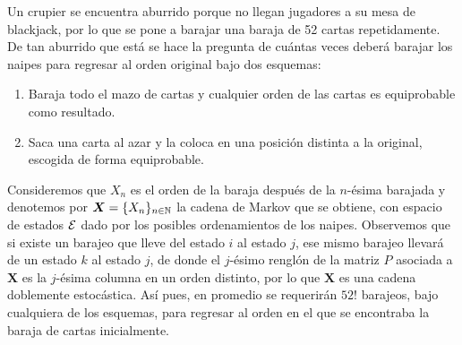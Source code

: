 \begin{example}
    Un crupier se encuentra aburrido porque no llegan jugadores a su mesa de blackjack, por lo que se pone a barajar una baraja de 52 cartas repetidamente. De tan aburrido que está se hace la pregunta de cuántas veces deberá barajar los naipes para regresar al orden original bajo dos esquemas:
    \begin{enumerate}
        \item Baraja todo el mazo de cartas y cualquier orden de las cartas es equiprobable como resultado.
        \item Saca una carta al azar y la coloca en una posición distinta a la original, escogida de forma equiprobable.
    \end{enumerate}
    Consideremos que $X_n$ es el orden de la baraja después de la $n$-ésima barajada y denotemos por $\bm X = \{X_n\}_{n \in \mathbb{N}}$ la cadena de Markov que se obtiene, con espacio de estados $\mathcal{E}$ dado por los posibles ordenamientos de los naipes. Observemos que si existe un barajeo que lleve del estado $i$ al estado $j$, ese mismo barajeo llevará de un estado $k$ al estado $j$, de donde el $j$-ésimo renglón de la matriz $P$ asociada a $\bm X$ es la $j$-ésima columna en un orden distinto, por lo que $\bm X$ es una cadena doblemente estocástica. Así pues, en promedio se requerirán $52!$ barajeos, bajo cualquiera de los esquemas, para regresar al orden en el que se encontraba la baraja de cartas inicialmente.
\end{example}

